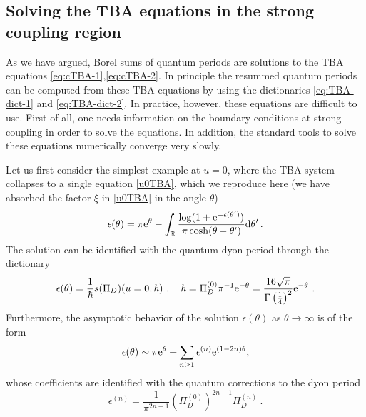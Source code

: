 \documentclass[a4paper,11pt]{article}
\theoremstyle{definition}
\def\IR{{\mathbb R}}
\newcommand{\re}{{\rm e}}
\newcommand{\rd}{{\rm d}}
\def\IR{\mathbb{R}}
\begin{document}
\subsection{Solving the TBA equations in the strong coupling
  region}\label{tbau0}

As we have argued, Borel sums of quantum periods are solutions to the TBA
equations \eqref{eq:cTBA-1},\eqref{eq:cTBA-2}. In principle the
resummed quantum periods can be computed from these TBA equations
by using the dictionaries \eqref{eq:TBA-dict-1} and
\eqref{eq:TBA-dict-2}. In practice, however, these equations are
difficult to use. First of all, one needs information on the boundary
conditions at strong coupling in order to solve the equations. In
addition, the standard tools to solve these equations numerically
converge very slowly.

Let us first consider the simplest example at $u=0$, where the TBA
system collapses to a single equation \eqref{u0TBA}, which we
reproduce here (we have absorbed the factor $\xi$ in \eqref{u0TBA} in
the angle $\theta$)
%
\begin{equation}\label{eq:cTBA-0}
  \epsilon(\theta) = \pi\re^{\theta} -
  \int_{\IR}\frac{\log(1+\re^{-\epsilon(\theta')})}
  {\pi\cosh(\theta-\theta')} 
  \rd \theta' \, .
\end{equation}
%
The solution can be identified with the quantum dyon period through
the dictionary
%
\begin{equation}
  \epsilon(\theta) = \frac{1}{\hbar}s(\Pi_D)(u=0,\hbar) \ ,\quad \hbar =
  \Pi^{(0)}_D \pi^{-1} \re^{-\theta}={16 \sqrt{\pi} \over \Gamma
    \left({1\over 4}\right)^2}\re^{-\theta} \ .
\end{equation}
%
Furthermore, the asymptotic behavior of the solution
$\epsilon(\theta)$ as $\theta \rightarrow \infty$ is of the form
%
\begin{equation}
  \epsilon(\theta)\sim  \pi \re^{\theta} + \sum_{n \ge 1} \epsilon^{(n)} \re^{(1-2n)\theta}, 
\end{equation}
%
whose coefficients are identified with the quantum corrections to the
dyon period
%
\begin{equation}
  \epsilon^{(n)} = \frac{1}{\pi^{2n-1}}(\Pi^{(0)}_D)^{2n-1} \Pi_D^{(n)}
  \ .
\end{equation}
 
\end{document}
